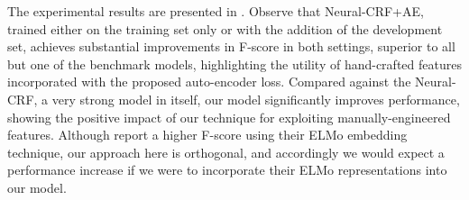 The experimental results are presented in .
Observe that Neural-CRF+AE, trained either on the training set only or with the addition of the development set, achieves substantial improvements in F-score in both settings, superior to all but one of the benchmark models, highlighting the utility of hand-crafted features incorporated with the proposed auto-encoder loss.
Compared against the Neural-CRF, a very strong model in itself, our model significantly improves performance, showing the positive impact of our technique for exploiting manually-engineered  features.
Although \citet{Peters+:2018} report a higher F-score using their ELMo embedding technique, our approach here is orthogonal, and accordingly we would expect a performance increase if we were to incorporate their ELMo representations into our model.
